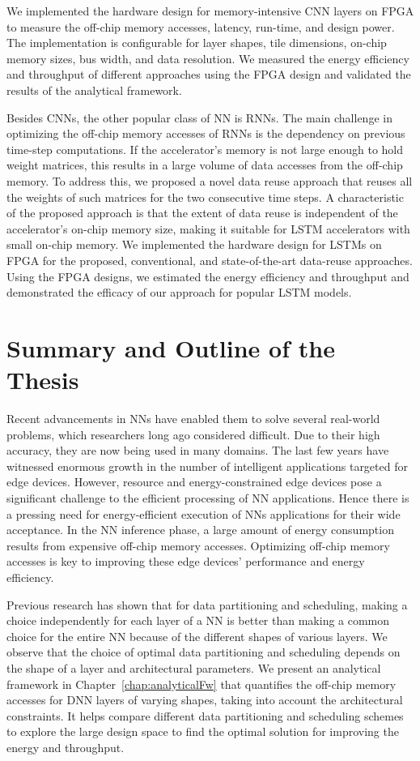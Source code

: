 We implemented the hardware design for memory-intensive CNN layers on FPGA to measure the off-chip memory accesses, latency, run-time, and design power. The implementation is configurable for layer shapes, tile dimensions, on-chip memory sizes, bus width, and data resolution. We measured the energy efficiency and throughput of different approaches using the FPGA design and validated the results of the analytical framework.

Besides CNNs, the other popular class of NN is RNNs. The main challenge in optimizing the off-chip memory accesses of RNNs is the dependency on previous time-step computations. If the accelerator's memory is not large enough to hold weight matrices, this results in a large volume of data accesses from the off-chip memory. To address this, we proposed a novel data reuse approach that reuses all the weights of such matrices for the two consecutive time steps. A characteristic of the proposed approach is that the extent of data reuse is independent of the accelerator's on-chip memory size, making it suitable for LSTM accelerators with small on-chip memory. We implemented the hardware design for LSTMs on FPGA for the proposed, conventional, and state-of-the-art data-reuse approaches. Using the FPGA designs, we estimated the energy efficiency and throughput and demonstrated the efficacy of our approach for popular LSTM models.
\section{Summary and Outline of the Thesis} 
Recent advancements in NNs have enabled them to solve several real-world problems, which researchers long ago considered difficult. Due to their high accuracy, they are now being used in many domains. The last few years have witnessed enormous growth in the number of intelligent applications targeted for edge devices. However, resource and energy-constrained edge devices pose a significant challenge to the efficient processing of NN applications. Hence there is a pressing need for energy-efficient execution of NNs applications for their wide acceptance. In the NN inference phase, a large amount of energy consumption results from expensive off-chip memory accesses. Optimizing off-chip memory accesses is key to improving these edge devices' performance and energy efficiency.

Previous research has shown that for data partitioning and scheduling, making a choice independently for each layer of a NN is better than making a common choice for the entire NN because of the different shapes of various layers. We observe that the choice of optimal data partitioning and scheduling depends on the shape of a layer and architectural parameters. We present an analytical framework in Chapter~\ref{chap:analyticalFw} that quantifies the off-chip memory accesses for DNN layers of varying shapes, taking into account the architectural constraints. It helps compare different data partitioning and scheduling schemes to explore the large design space to find the optimal solution for improving the energy and throughput. 

